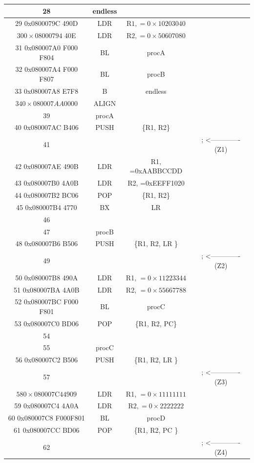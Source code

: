 \documentclass[10pt]{article}
\begin{document}
\begin{center}
\begin{tabular}{|c|c|c|c|}
\hline
28 & endless &  &  \\
\hline
29 0x0800079C 490D & LDR & $\mathrm{R} 1,=0 \times 10203040$ &  \\
\hline
$300 \times 0800079 \mathrm{4}$ 40E & LDR & $\mathrm{R} 2,=0 \times 50607080$ &  \\
\hline
31 0x080007A0 F000 F804 & BL & procA &  \\
\hline
32 0x080007A4 F000 F807 & BL & procB &  \\
\hline
33 0x080007A8 E7F8 & B & endless &  \\
\hline
$340 \times 080007 A A 0000$ & ALIGN &  &  \\
\hline
39 & procA &  &  \\
\hline
40 0x080007AC B406 & PUSH & \{R1, R2\} &  \\
\hline
41 &  &  & ; <------------- (Z1) \\
\hline
42 0x080007AE 490B & LDR & R1, =0xAABBCCDD &  \\
\hline
43 0x080007B0 4A0B & LDR & R2, =0xEEFF1020 &  \\
\hline
44 0x080007B2 BC06 & POP & \{R1, R2\} &  \\
\hline
45 0x080007B4 4770 & BX & LR &  \\
\hline
46 &  &  &  \\
\hline
47 & procB &  &  \\
\hline
48 0x080007B6 B506 & PUSH & \{R1, R2, LR \} &  \\
\hline
49 &  &  & ; <------------- (Z2) \\
\hline
50 0x080007B8 490A & LDR & R1, $=0 \times 11223344$ &  \\
\hline
51 0x080007BA 4A0B & LDR & R2, $=0 \times 55667788$ &  \\
\hline
52 0x080007BC F000 F801 & BL & procC &  \\
\hline
53 0x080007C0 BD06 & POP & \{R1, R2, PC\} &  \\
\hline
54 &  &  &  \\
\hline
55 & procC &  &  \\
\hline
56 0x080007C2 B506 & PUSH & \{R1, R2, LR \} &  \\
\hline
57 &  &  & ; <------------- (Z3) \\
\hline
$580 \times 080007 \mathrm{C} 44909$ & LDR & R1, $=0 \times 11111111$ &  \\
\hline
59 0x080007C4 4A0A & LDR & $\mathrm{R} 2,=0 \times 2222222$ &  \\
\hline
60 0x080007C8 F000F801 & BL & procD &  \\
\hline
61 0x080007CC BD06 & POP & \{R1, R2, PC \} &  \\
\hline
62 &  &  & ; <------------- (Z4) \\
\hline
\end{tabular}
\end{center}
\end{document}
